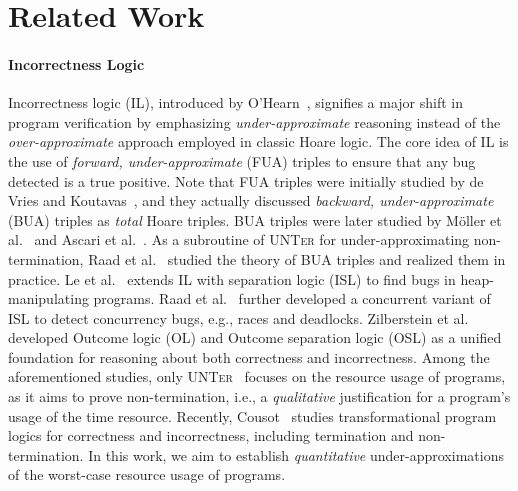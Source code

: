 \section{Related Work}
\label{sec:related}


\paragraph*{Incorrectness Logic}
%
Incorrectness logic (IL), introduced by O'Hearn~\cite{POPL:OHearn20}, signifies a major shift in program verification by emphasizing \emph{under-approximate} reasoning instead of the \emph{over-approximate} approach employed in classic Hoare logic.
%
The core idea of IL is the use of \emph{forward, under-approximate} (FUA) triples to ensure that any bug detected is a true positive.
%
Note that FUA triples were initially studied by de Vries and Koutavas~\cite{SEFM:dVK11}, and they actually discussed \emph{backward, under-approximate} (BUA) triples as \emph{total} Hoare triples.
%
BUA triples were later studied by M{\"o}ller et al.~\cite{RAMiCS:MHH21} and Ascari et al.~\cite{arxiv:ABG23}.
%
As a subroutine of \textsc{UNTer} for under-approximating non-termination, Raad et al.~\cite{OOPSLA:RVO24} studied the theory of BUA triples and realized them in practice.
%
Le et al.~\cite{OOPSLA:LRV22} extends IL with separation logic (ISL) to find bugs in heap-manipulating programs.
%
Raad et al.~\cite{POPL:RBD22} further developed a concurrent variant of ISL to detect concurrency bugs, e.g., races and deadlocks.
%
Zilberstein et al.~\cite{OOPSLA:ZDS23,OOPSLA:ZSS24} developed Outcome logic (OL) and Outcome separation logic (OSL) as a unified foundation for reasoning about both correctness and incorrectness.
%
Among the aforementioned studies, only \textsc{UNTer}~\cite{OOPSLA:RVO24} focuses on the resource usage of programs, as it aims to prove non-termination, i.e., a \emph{qualitative} justification for a program's usage of the time resource.
%
Recently, Cousot~\cite{POPL:Cousot25} studies transformational program logics for correctness and incorrectness, including termination and non-termination.
%
In this work, we aim to establish \emph{quantitative} under-approximations of the worst-case resource usage of programs. 

